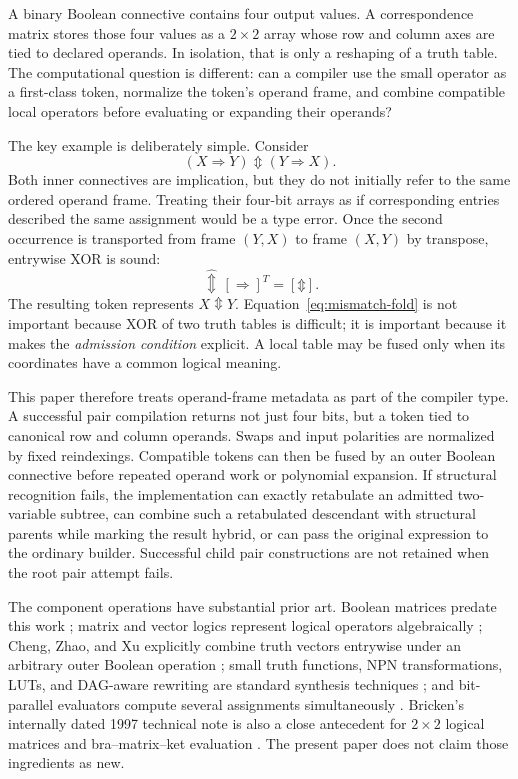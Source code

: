 \documentclass[10pt]{article}
\newcommand{\bxor}{\mathbin{\Updownarrow}}
\newcommand{\ptop}[1]{\widehat{#1}}
\theoremstyle{plain}
\theoremstyle{definition}
\theoremstyle{remark}
\begin{document}
A binary Boolean connective contains four output values. A correspondence matrix stores those four values as a $2\times2$ array whose row and column axes are tied to declared operands. In isolation, that is only a reshaping of a truth table. The computational question is different: can a compiler use the small operator as a first-class token, normalize the token's operand frame, and combine compatible local operators before evaluating or expanding their operands?

The key example is deliberately simple. Consider
\begin{equation}
 (X\Rightarrow Y)\bxor(Y\Rightarrow X).
 \label{eq:mismatch-expression}
\end{equation}
Both inner connectives are implication, but they do not initially refer to the same ordered operand frame. Treating their four-bit arrays as if corresponding entries described the same assignment would be a type error. Once the second occurrence is transported from frame $(Y,X)$ to frame $(X,Y)$ by transpose, entrywise XOR is sound:
\begin{equation}
 [\Rightarrow]\,\ptop{\bxor}\,[\Rightarrow]^T=[\bxor].
 \label{eq:mismatch-fold}
\end{equation}
The resulting token represents $X\bxor Y$. Equation~\eqref{eq:mismatch-fold} is not important because XOR of two truth tables is difficult; it is important because it makes the \emph{admission condition} explicit. A local table may be fused only when its coordinates have a common logical meaning.

This paper therefore treats operand-frame metadata as part of the compiler type. A successful pair compilation returns not just four bits, but a token tied to canonical row and column operands. Swaps and input polarities are normalized by fixed reindexings. Compatible tokens can then be fused by an outer Boolean connective before repeated operand work or polynomial expansion. If structural recognition fails, the implementation can exactly retabulate an admitted two-variable subtree, can combine such a retabulated descendant with structural parents while marking the result hybrid, or can pass the original expression to the ordinary builder. Successful child pair constructions are not retained when the root pair attempt fails.

The component operations have substantial prior art. Boolean matrices predate this work \cite{Edwards1972}; matrix and vector logics represent logical operators algebraically \cite{Stern1988,Mizraji1992,Mizraji2008}; Cheng, Zhao, and Xu explicitly combine truth vectors entrywise under an arbitrary outer Boolean operation \cite{Cheng2011}; small truth functions, NPN transformations, LUTs, and DAG-aware rewriting are standard synthesis techniques \cite{Mishchenko2006,Zhou2019,Testa2019}; and bit-parallel evaluators compute several assignments simultaneously \cite{Lee2022}. Bricken's internally dated 1997 technical note is also a close antecedent for $2\times2$ logical matrices and bra--matrix--ket evaluation \cite{Bricken1997}. The present paper does not claim those ingredients as new.
\end{document}
